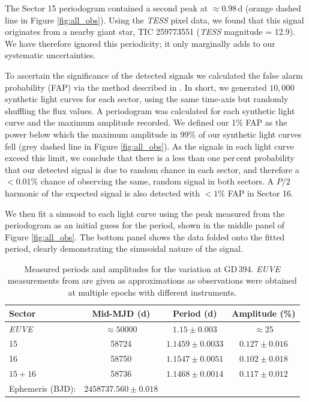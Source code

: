 \documentclass{aastex63}
\begin{document}
The Sector 15 periodogram contained a second peak at $\approx 0.98$\,d (orange dashed line in Figure \ref{fig:all_obs}). Using the \textit{TESS} pixel data, we found that this signal originates from a nearby giant star, TIC 259773551 (\textit{TESS} magnitude = 12.9). We have therefore ignored this periodicity; it only marginally adds to our  systematic uncertainties.

To ascertain the significance of the detected signals we calculated the false alarm probability (FAP) via the method described in \citet{hermesetal17-1,belletal19-1}. In short, we generated $10{,}000$ synthetic light curves for each sector, using the same time-axis but randomly shuffling the flux values. A periodogram was calculated for each synthetic light curve and the maximum amplitude recorded. We defined our 1\% FAP as the power below which the maximum amplitude in 99\% of our synthetic light curves fell (grey dashed line in Figure \ref{fig:all_obs}). As the signals in each light curve exceed this limit, we conclude that there is a less than one per\,cent probability that our detected signal is due to random chance in each sector, and therefore a $<$0.01\% chance of observing the same, random signal in both sectors. A $P/2$ harmonic of the expected signal is also detected with $< 1\%$ FAP in Sector 16. 


We then fit a sinusoid to each light curve using the peak measured from the periodogram as an initial guess for the period, shown in the middle panel of Figure \ref{fig:all_obs}.
The bottom panel shows the data folded onto the fitted period, clearly demonstrating the sinusoidal nature of the signal.

\begin{table}
    \centering
    \begin{tabular}{lccc}
        Sector & Mid-MJD (d) & Period (d) & Amplitude (\%)  \\ \hline
        \textit{EUVE} & $\approx50000$ & $1.15\pm0.003$ & $\approx25$ \\
         15 & 58724   &$1.1459\pm0.0033$ & $0.127\pm0.016$ \\
         16 & 58750 &$1.1547\pm0.0051$& $0.102\pm0.018$ \\
        $15+16$ & 58736 & $1.1468\pm0.0014$ & $0.117\pm0.012$ \\
        Ephemeris (BJD):  & $2458737.560\pm0.018$ & \\
    \end{tabular}
    \caption{Measured periods and amplitudes for the variation at GD\,394. \textit{EUVE} measurements from \citet{dupuisetal00-1} are given as approximations as observations were obtained at multiple epochs with different instruments.} 
    \label{tab:peramp}
\end{table}
\end{document}
